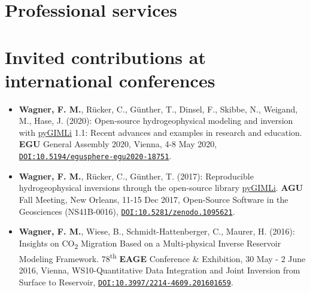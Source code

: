 \documentclass[11pt,a4paper,serif,linkcolor=true]{moderncv} %
\begin{document}
\section{Professional services}

\section{Invited contributions at international conferences}
\begin{itemize}[label={},itemindent=-1.8em,leftmargin=1.8em]
	\item \textbf{Wagner, F. M.}, Rücker, C., Günther, T., Dinsel, F., Skibbe, N., Weigand, M., Hase, J. (2020): Open-source hydrogeophysical modeling and inversion with \href{http://www.pygimli.org/}{pyGIMLi} 1.1: Recent advances and examples in research and education. \textbf{EGU} General Assembly 2020, Vienna,
	4-8 May 2020,
	\href{https://doi.org/10.5194/egusphere-egu2020-18751}{\nolinkurl{DOI:10.5194/egusphere-egu2020-18751}}.
	\item \textbf{Wagner, F. M.}, Rücker, C., Günther, T. (2017): Reproducible
	hydrogeophysical inversions through the open-source library
	\href{http://www.pygimli.org/}{pyGIMLi}. \textbf{AGU} Fall Meeting, New Orleans,
	11-15 Dec 2017, Open-Source Software in the Geosciences (NS41B-0016),
	\href{https://doi.org/10.5281/zenodo.1095621}{\nolinkurl{DOI:10.5281/zenodo.1095621}}.
	\item \textbf{Wagner, F. M.}, Wiese, B., Schmidt-Hattenberger, C., Maurer, H.
	(2016): Insights on CO\textsubscript{2} Migration Based on a
	Multi-physical Inverse Reservoir Modeling Framework.
	78\textsuperscript{th} \textbf{EAGE} Conference \& Exhibition, 30 May - 2 June
	2016, Vienna, WS10-Quantitative Data Integration and Joint Inversion
	from Surface to Reservoir,
	\href{https://doi.org/10.3997/2214-4609.201601659}{\nolinkurl{DOI:10.3997/2214-4609.201601659}}.
\end{itemize}


\end{document}
